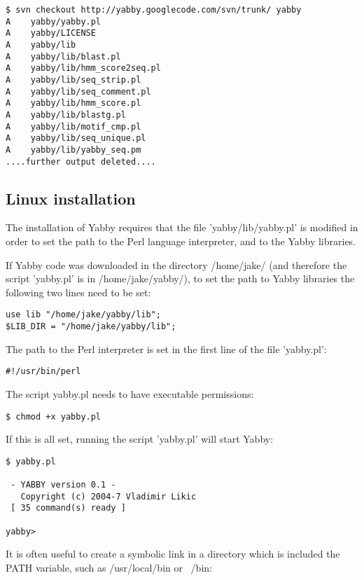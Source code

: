 \begin{verbatim}
$ svn checkout http://yabby.googlecode.com/svn/trunk/ yabby
A    yabby/yabby.pl
A    yabby/LICENSE
A    yabby/lib
A    yabby/lib/blast.pl
A    yabby/lib/hmm_score2seq.pl
A    yabby/lib/seq_strip.pl
A    yabby/lib/seq_comment.pl
A    yabby/lib/hmm_score.pl
A    yabby/lib/blastg.pl
A    yabby/lib/motif_cmp.pl
A    yabby/lib/seq_unique.pl
A    yabby/lib/yabby_seq.pm
....further output deleted....
\end{verbatim}

\subsection{Linux installation}

The installation of Yabby requires that the file 'yabby/lib/yabby.pl' is
modified in order to set the path to the Perl language interpreter,
and to the Yabby libraries.

If Yabby code was downloaded in the directory /home/jake/ (and
therefore the script 'yabby.pl' is in /home/jake/yabby/), to set
the path to Yabby libraries the following two lines need to be
set: 

\begin{verbatim}
use lib "/home/jake/yabby/lib";
$LIB_DIR = "/home/jake/yabby/lib";
\end{verbatim}

The path to the Perl interpreter is set in the first line of the
file 'yabby.pl':

\begin{verbatim}
#!/usr/bin/perl
\end{verbatim}

The script yabby.pl needs to have executable permissions:

\begin{verbatim}
$ chmod +x yabby.pl
\end{verbatim}

If this is all set, running the script 'yabby.pl' will start Yabby:

\begin{verbatim}
$ yabby.pl

 - YABBY version 0.1 - 
   Copyright (c) 2004-7 Vladimir Likic
 [ 35 command(s) ready ]

yabby>
\end{verbatim}

It is often useful to create a symbolic link in a directory which
is included the PATH variable, such as /usr/local/bin or ~/bin:

